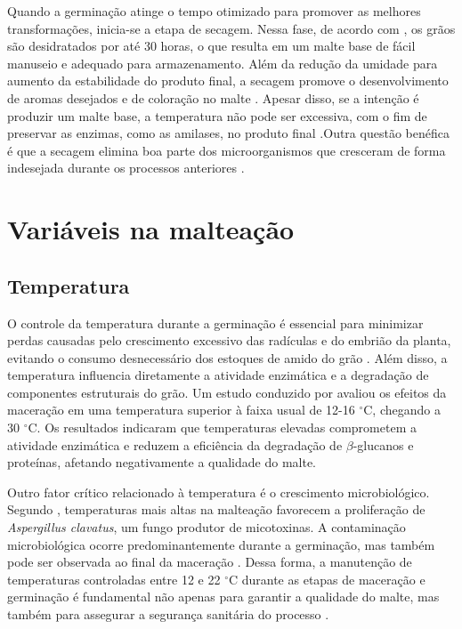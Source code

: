Quando a germinação atinge o tempo otimizado para promover as melhores transformações, inicia-se a etapa de secagem. Nessa fase, de acordo com , os grãos são desidratados por até 30 horas, o que resulta em um malte base de fácil manuseio e adequado para armazenamento. Além da redução da umidade para aumento da estabilidade do produto final, a secagem promove o desenvolvimento de aromas desejados e de coloração no malte \cite{BAMFORTH2003}. Apesar disso, se a intenção é produzir um malte base, a temperatura não pode ser excessiva, com o fim de preservar as enzimas, como as amilases, no produto final \cite{LEWIS2012}.Outra questão benéfica é que a secagem elimina boa parte dos microorganismos que cresceram de forma indesejada durante os processos anteriores \cite{DOUGLAS1988, PETTERS1988}. 


\section{Variáveis na malteação}

\subsection{Temperatura}

O controle da temperatura durante a germinação é essencial para minimizar perdas causadas pelo crescimento excessivo das radículas e do embrião da planta, evitando o consumo desnecessário dos estoques de amido do grão \cite{PITZ1990, MALLETT2022}. Além disso, a temperatura influencia diretamente a atividade enzimática e a degradação de componentes estruturais do grão. Um estudo conduzido por  avaliou os efeitos da maceração em uma temperatura superior à faixa usual de 12-16 $^{\circ}$C, chegando a 30 $^{\circ}$C. Os resultados indicaram que temperaturas elevadas comprometem a atividade enzimática e reduzem a eficiência da degradação de $\beta$-glucanos e proteínas, afetando negativamente a qualidade do malte.

Outro fator crítico relacionado à temperatura é o crescimento microbiológico. Segundo , temperaturas mais altas na malteação favorecem a proliferação de \textit{Aspergillus clavatus}, um fungo produtor de micotoxinas. A contaminação microbiológica ocorre predominantemente durante a germinação, mas também pode ser observada ao final da maceração \cite{PETTERS1988}. Dessa forma, a manutenção de temperaturas controladas entre 12 e 22 $^{\circ}$C durante as etapas de maceração e germinação é fundamental não apenas para garantir a qualidade do malte, mas também para assegurar a segurança sanitária do processo \cite{TANGNI2002}.

